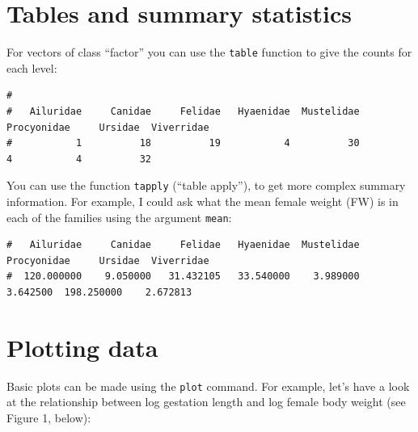\documentclass[
  a4paperpaper,
]{book}
\newenvironment{Shaded}{\begin{snugshade}}{\end{snugshade}}
\newcommand{\KeywordTok}[1]{\textcolor[rgb]{0.13,0.29,0.53}{\textbf{#1}}}
\newcommand{\NormalTok}[1]{#1}
\newcommand{\OperatorTok}[1]{\textcolor[rgb]{0.81,0.36,0.00}{\textbf{#1}}}
\begin{document}
\hypertarget{tables-and-summary-statistics}{%
\section{Tables and summary statistics}\label{tables-and-summary-statistics}}

For vectors of class ``factor'' you can use the \texttt{table} function to give the counts for each level:

\begin{Shaded}
\end{Shaded}

\begin{verbatim}
# 
#   Ailuridae     Canidae     Felidae   Hyaenidae  Mustelidae Procyonidae     Ursidae  Viverridae 
#           1          18          19           4          30           4           4          32
\end{verbatim}

You can use the function \texttt{tapply} (``table apply''), to get more complex summary information. For example, I could ask what the mean female weight (FW) is in each of the families using the argument \texttt{mean}:

\begin{Shaded}
\end{Shaded}

\begin{verbatim}
#   Ailuridae     Canidae     Felidae   Hyaenidae  Mustelidae Procyonidae     Ursidae  Viverridae 
#  120.000000    9.050000   31.432105   33.540000    3.989000    3.642500  198.250000    2.672813
\end{verbatim}

\hypertarget{plotting-data}{%
\section{Plotting data}\label{plotting-data}}

Basic plots can be made using the \texttt{plot} command. For example, let's have a look at the relationship between log gestation length and log female body weight (see Figure 1, below):
\end{document}
